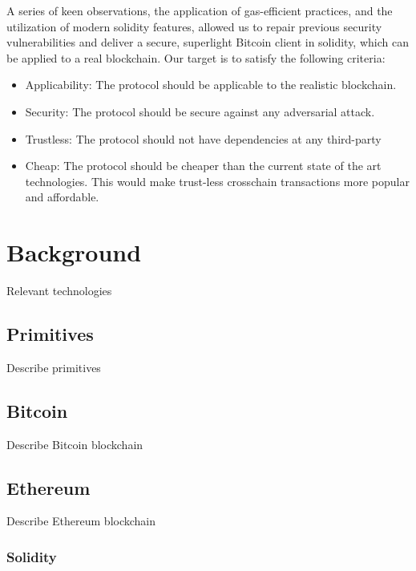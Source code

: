 \documentclass{article}
\begin{document}
  A series of keen observations, the application of gas-efficient
  practices, and the utilization of modern solidity features, allowed us
  to repair previous security vulnerabilities and deliver a secure,
  superlight Bitcoin client in solidity, which can be applied to a real
  blockchain. \newline \newline Our target is to satisfy the following
  criteria:
  \begin{itemize}
  \item
    Applicability: The protocol should be applicable to the realistic
    blockchain.
  \item
    Security: The protocol should be secure against any adversarial
    attack.
  \item
    Trustless: The protocol should not have dependencies at any
    third-party
  \item
    Cheap: The protocol should be cheaper than the current state of the
    art technologies. This would make trust-less crosschain transactions
    more popular and affordable.
  \end{itemize}

  \pagebreak

  \section{Background}

  Relevant technologies

  \subsection{Primitives}

  Describe primitives

  \subsection{Bitcoin}

  Describe Bitcoin blockchain

  \subsection{Ethereum}

  Describe Ethereum blockchain

  \subsubsection{Solidity}
\end{document}
